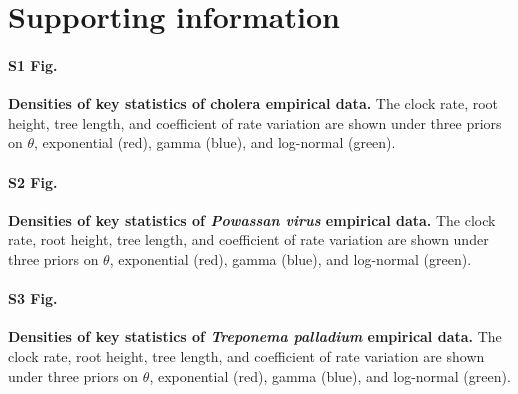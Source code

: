 \documentclass[10pt,letterpaper]{article}
\begin{document}
\nolinenumbers


%
%
% 


\section*{Supporting information}

\paragraph*{S1 Fig.}
\label{S1_Fig}
	\textbf{Densities of key statistics of cholera empirical data.} The clock rate, root height, tree length, and coefficient of rate variation are shown under three priors on $\theta$, exponential (red), gamma (blue), and log-normal (green).

\paragraph*{S2 Fig.}
\label{S2_Fig}
	\textbf{Densities of key statistics of \textit{Powassan virus} empirical data.} The clock rate, root height, tree length, and coefficient of rate variation are shown under three priors on $\theta$, exponential (red), gamma (blue), and log-normal (green).

\paragraph*{S3 Fig.}
\label{S3_Fig}
	\textbf{Densities of key statistics of \textit{Treponema palladium} empirical data.} The clock rate, root height, tree length, and coefficient of rate variation are shown under three priors on $\theta$, exponential (red), gamma (blue), and log-normal (green).
\end{document}
